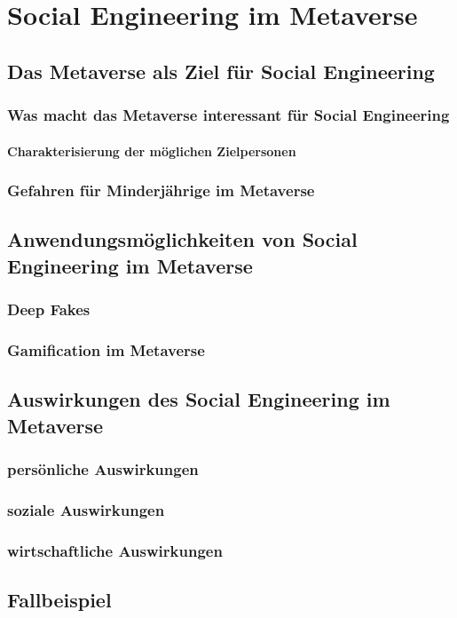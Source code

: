 \chapter{Social Engineering im Metaverse}\label{ch:SocialEngineeringimMV}

\section{Das Metaverse als Ziel für Social Engineering}

\subsection{Was macht das Metaverse interessant für Social Engineering}

\subsubsection{Charakterisierung der möglichen Zielpersonen}

\subsection{Gefahren für Minderjährige im Metaverse}

\section{Anwendungsmöglichkeiten von Social Engineering im Metaverse}

\subsection{Deep Fakes}
\subsection{Gamification im Metaverse}

\section{Auswirkungen des Social Engineering im Metaverse}

\subsection{persönliche Auswirkungen}
\subsection{soziale Auswirkungen}
\subsection{wirtschaftliche Auswirkungen}

\section{Fallbeispiel}